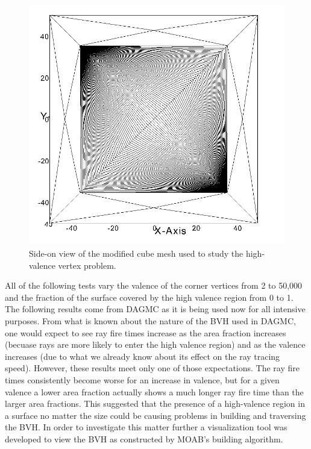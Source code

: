\documentclass[10pt, a4paper]{article}
\begin{document}
\begin{figure}[H]
  \centering
    \includegraphics[scale=0.2]{hv_study_design.png}
    \caption{Side-on view of the modified cube mesh used to study the high-valence vertex problem.}
\end{figure}

All of the following tests vary the valence of the corner vertices from 2 to 50,000 and the fraction of the surface covered by the high valence region from 0 to 1. The following results come from DAGMC as it is being used now for all intensive purposes. From what is known about the nature of the BVH used in DAGMC, one would expect to see ray fire times increase as the area fraction increases (becuase rays are more likely to enter the high valence region) and as the valence increases (due to what we already know about its effect on the ray tracing speed). However, these results meet only one of those expectations. The ray fire times consistently become worse for an increase in valence, but for a given valence a lower area fraction actually shows a much longer ray fire time than the larger area fractions. This suggested that the presence of a high-valence region in a surface no matter the size could be causing problems in building and traversing the BVH. In order to investigate this matter further a visualization tool was developed to view the BVH as constructed by MOAB's building algorithm.
\end{document}
